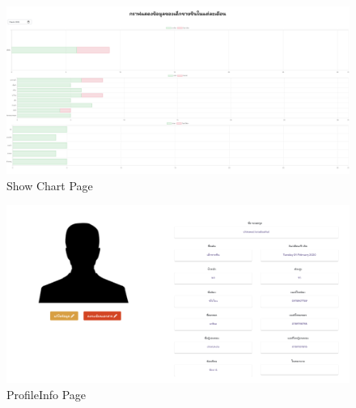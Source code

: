 \begin{figure}
  \begin{center}
  \includegraphics[width=\linewidth]{images/ChartPage.png}
  \end{center}
  \caption[Poem]{Show Chart Page}
  \label{fig:ChartPage}
  \end{figure}
  
\begin{figure}
  \begin{center}
  \includegraphics[width=\linewidth]{images/ProfileInfo.png}
  \end{center}
  \caption[Poem]{ProfileInfo Page}
  \label{fig:ProfileTwo}
  \end{figure}

